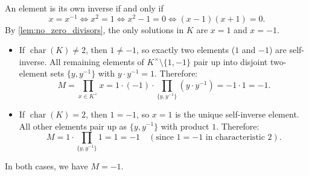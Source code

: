 \begin{exercisesolution}
\begin{enumerate}[label=\textbf{(\alph*)}]
    An element is its own inverse if and only if
    \[
    x = x^{-1} \iff x^2 = 1 \iff x^2 - 1 = 0 \iff (x - 1)(x + 1) = 0.
    \]
    By \cref{lem:no_zero_divisors}, the only solutions in $K$ are $x = 1$ and $x = -1$.
    \begin{itemize}
        \item If $\operatorname{char}(K) \ne 2$, then $1 \ne -1$, so exactly two elements ($1$ and $-1$) are self-inverse. All remaining elements of $K^\times \setminus \{1, -1\}$ pair up into disjoint two-element sets $\{y, y^{-1}\}$ with $y \cdot y^{-1} = 1$. Therefore:
        \[
        M = \prod_{x \in K^\times} x = 1 \cdot (-1) \cdot \prod_{\{y, y^{-1}\}} (y \cdot y^{-1}) = -1 \cdot 1 = -1.
        \]
        \item If $\operatorname{char}(K) = 2$, then $1 = -1$, so $x = 1$ is the unique self-inverse element. All other elements pair up as $\{y, y^{-1}\}$ with product $1$. Therefore:
        \[
        M = 1 \cdot \prod_{\{y, y^{-1}\}} 1 = 1 = -1 \quad (\text{since } 1 = -1 \text{ in characteristic } 2).
        \]
    \end{itemize}
    In both cases, we have $M = -1$.
\end{enumerate}
\end{exercisesolution}
